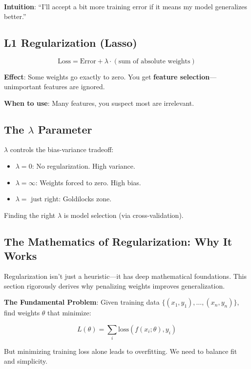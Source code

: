 \documentclass[11pt,oneside]{book}
\begin{document}
\textbf{Intuition}: ``I'll accept a bit more training error if it means my model generalizes better.''

\subsection{L1 Regularization (Lasso)}

\begin{equation}
\text{Loss} = \text{Error} + \lambda \cdot (\text{sum of absolute weights})
\end{equation}

\textbf{Effect}: Some weights go exactly to zero. You get \textbf{feature selection}—unimportant features are ignored.

\textbf{When to use}: Many features, you suspect most are irrelevant.

\subsection{The $\lambda$ Parameter}

$\lambda$ controls the bias-variance tradeoff:
\begin{itemize}
    \item $\lambda = 0$: No regularization. High variance.
    \item $\lambda = \infty$: Weights forced to zero. High bias.
    \item $\lambda = $ just right: Goldilocks zone.
\end{itemize}

Finding the right $\lambda$ is model selection (via cross-validation).

\subsection{The Mathematics of Regularization: Why It Works}

Regularization isn't just a heuristic—it has deep mathematical foundations. This section rigorously derives why penalizing weights improves generalization.

\textbf{The Fundamental Problem}: Given training data $\{(x_1, y_1), \ldots, (x_n, y_n)\}$, find weights $\theta$ that minimize:

\begin{equation}
L(\theta) = \sum_{i} \text{loss}(f(x_i; \theta), y_i)
\end{equation}

But minimizing training loss alone leads to overfitting. We need to balance fit and simplicity.
\end{document}
